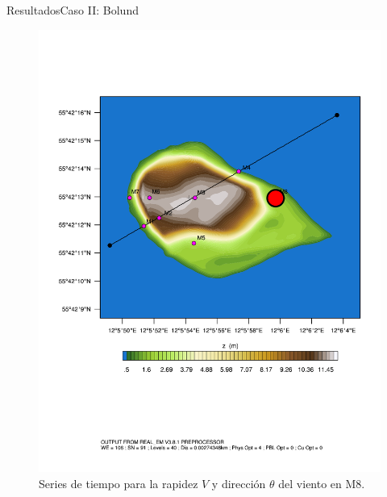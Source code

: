 \documentclass[mathserif,10pt]{beamer}
\begin{document}
\begin{frame}{Resultados}{Caso II: Bolund}
\begin{figure}[H]
\begin{minipage}{0.35\linewidth}
		\includegraphics[width=1\linewidth,page=1,trim={3.5cm 9.3cm 0.8cm 3.8cm},clip]{fig/05/ppt/bol_control_point8.pdf}%
	\end{minipage}%
		\vspace{-2mm}\caption{Series de tiempo para la rapidez $V$ y dirección $\theta$ del viento en M8.}
		\label{fig:06_bol_ts_m8}
	\end{figure}
\end{frame}
\end{document}
